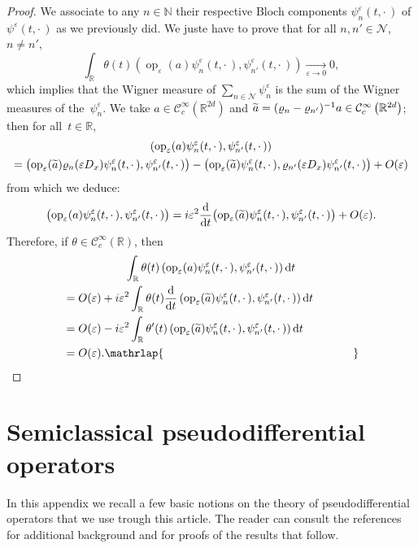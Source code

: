 \documentclass[10pt]{amsart}
\theoremstyle{definition}
\DeclareMathOperator{\op}{op}
\newcommand*\R{{\mathbb R}}
\newcommand*\N{{\mathbb N}}
\newcommand*\eps{\varepsilon}
\numberwithin{equation}{section}
\def\Tend#1#2{\mathop{\longrightarrow}\limits_{#1\rightarrow#2}}
\let\oldtilde\tilde
\renewcommand*{\tilde}[1]{\mathchoice{\widetilde{#1}}{\widetilde{#1}}{\oldtilde{#1}}{\oldtilde{#1}}}
\newcommand*{\dd}{\mathrm{d}}
\newcommand*{\dt}{\dd t}
\begin{document}
\begin{proof}
We associate to any $n\in \N$ their respective Bloch components $\psi^\eps_n(t,\cdot\,)$ of $\psi^\eps (t,\cdot\,)$ as we previously did. We juste have to prove that for all $n,n'\in{\mathcal N}$, $n\not=n'$,
\[
\int_\R\theta(t) \left({\op}_\eps(a) \psi^\eps_n(t,\cdot\,),\psi^\eps_{n'}(t,\cdot\,)\right)\Tend{\eps}{0} 0,
\]
which implies that the Wigner measure of $\sum_{n\in{\mathcal N}}\psi^\eps_n$ is the sum of the Wigner measures of the~$\psi^\eps_n$. We take $a\in{\mathcal C}_c^\infty (\R^{2d})$ and $\tilde{a} = (\varrho_n-\varrho_{n'})^{-1} a \in {\mathcal C}_c^\infty\left(\R^{2d}\right)$; then for all~$t\in\R$,
\begin{multline*}
\left({\op}_\eps(a) \psi^\eps_n(t,\cdot\,),\psi^\eps_{n'}(t,\cdot\,)\right) \\
= \big({\op}_\eps(\tilde{a})\varrho_n(\eps D_x) \psi^\eps_n(t,\cdot\,),\psi^\eps_{n'}(t,\cdot\,)\big) - \big({\op}_\eps(\tilde{a}) \psi^\eps_n(t,\cdot\,),\varrho_{n'}(\eps D_x)\psi ^\eps_{n'}(t,\cdot\,)\big) + O(\eps)
\end{multline*}
from which we deduce:
\[
\big({\op}_\eps(a) \psi^\eps_n(t,\cdot\,),\psi^\eps_{n'}(t,\cdot\,)\big)= i\eps^2 \frac{\dd}{\dt} \big({\op}_\eps(\tilde{a}) \psi^\eps_n(t,\cdot\,),\psi^\eps_{n'}(t,\cdot\,)\big) +O(\eps).
\]
Therefore, if $\theta\in {\mathcal C}_c^\infty(\R)$, then
\begin{multline*}
\int_\R \theta(t) \left({\op}_\eps(a) \psi^\eps_n(t,\cdot\,),\psi^\eps_{n'}(t,\cdot\,)\right)\dt\\
\begin{aligned}
&= O(\eps) + i\eps^2 \int _\R \theta(t) \frac{\dd}{\dt} \left({\op}_\eps(\tilde{a}) \psi^\eps_n(t,\cdot\,),\psi^\eps_{n'}(t,\cdot\,)\right) \dt\\
&= O(\eps) - i\eps^2 \int _\R \theta'(t) \left({\op}_\eps(\tilde{a})\psi^\eps_n(t,\cdot\,),\psi^\eps_{n'}(t,\cdot\,)\right)\dt \\
&= O(\eps). \mathrlap{\mkern 301mu\qed}
\end{aligned}
\end{multline*}
\let\qed\relax
\end{proof}



\appendix
\section{Semiclassical pseudodifferential operators}\label{sec:pdo}

In this appendix we recall a few basic notions on the theory of pseudodifferential operators that we use trough this article. The reader can consult the references~\cite{AlinhacGerard, DimassiSjostrand, F:14, MartinezBook, Zwobook} for additional background and for proofs of the results that follow.
\end{document}
